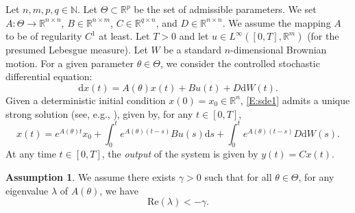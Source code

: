 \documentclass[a4paper]{article}
\theoremstyle{definition}
\newtheorem{assumption}[theorem]{Assumption}
\theoremstyle{remark}
\newcommand{\R}{\mathbb{R}}
\newcommand{\N}{\mathbb{N}}
\newcommand{\diff}{\mathrm{d}}
\begin{document}
Let $n,m,p,q\in \N$. Let $\Theta\subset \R^p$ be the set of admissible parameters. We set $A:\Theta\to \R^{n\times n}$, $B\in \R^{n\times m}$, $C\in \R^{q\times n}$, and $D\in \R^{n\times n}$. We assume the mapping $A$ to be of regularity $C^1$ at least. Let $T>0$ and let $u\in L^\infty([0,T],\R^m)$ (for the presumed Lebesgue measure). Let $W$ be a standard $n$-dimensional Brownian motion. For a given parameter $\theta\in \Theta$,  we consider the controlled stochastic differential equation:
\begin{equation}\label{E:sde1}
\diff x(t)=A(\theta) x(t) + B u(t)+D \diff W(t).
\end{equation}
Given a deterministic initial condition $x(0)=x_0\in \R^n$, \eqref{E:sde1} admits a unique strong solution  (see, e.g., \cite{oksendal2013stochastic}), given by, for any $t\in [0,T]$,
\begin{equation}\label{E:VarConst}
x(t)=e^{A(\theta)t}x_0+\int_0^t e^{A(\theta)(t-s)}Bu(s)\diff s
+
\int_0^t e^{A(\theta)(t-s)}D \diff W(s).
\end{equation}
At any time $t\in [0,T]$, the \emph{output} of the system is given by $y(t)=C x(t)$.



\begin{assumption}\label{As:Gap}
We assume there exists $\gamma>0$ such that for all $\theta\in \Theta$, for any eigenvalue $\lambda$ of $A(\theta)$, we have
$$
\mathrm{Re}(\lambda)<-\gamma.
$$
\end{assumption}
\end{document}
